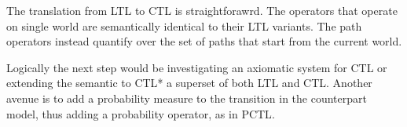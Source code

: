 The translation from \ac{LTL} to \ac{CTL} is straightforawrd. The operators that operate on single world are
semantically identical to their \ac{LTL} variants. The path operators instead quantify over the set of paths that start
from the current world.

Logically the next step would be investigating an axiomatic system for \ac{CTL} or extending the semantic to \ac{CTL}* a
superset of both \ac{LTL} and \ac{CTL}. Another avenue is to add a probability measure to the transition in the
counterpart model, thus adding a probability operator, as in \ac{PCTL}.
